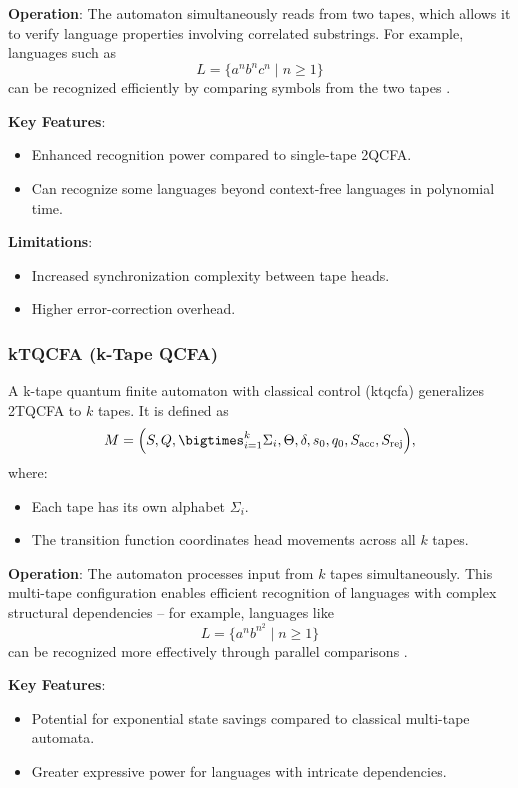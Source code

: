 \textbf{Operation}:  
The automaton simultaneously reads from two tapes, which allows it to verify language properties involving correlated substrings. For example, languages such as 
\[
L = \{a^n b^n c^n \mid n \geq 1\}
\]
can be recognized efficiently by comparing symbols from the two tapes \cite{zheng2012two}.

\textbf{Key Features}:
\begin{itemize}
    \item Enhanced recognition power compared to single-tape 2QCFA.
    \item Can recognize some languages beyond context-free languages in polynomial time.
\end{itemize}

\textbf{Limitations}:
\begin{itemize}
    \item Increased synchronization complexity between tape heads.
    \item Higher error-correction overhead.
\end{itemize}

\subsubsection{kTQCFA (k-Tape QCFA)}
\label{sssec:ktqcfa}
\begin{definition}[kTQCFA]
A k-tape quantum finite automaton with classical control (\gls{ktqcfa}) generalizes 2TQCFA to \( k \) tapes. It is defined as 
\[
M = \Bigl(S, Q, \bigtimes_{i=1}^{k} \Sigma_i, \Theta, \delta, s_0, q_0, S_{\text{acc}}, S_{\text{rej}}\Bigr),
\]
where:
\begin{itemize}
    \item Each tape has its own alphabet \( \Sigma_i \).
    \item The transition function coordinates head movements across all \( k \) tapes.
\end{itemize}
\end{definition}

\textbf{Operation}:  
The automaton processes input from \( k \) tapes simultaneously. This multi-tape configuration enables efficient recognition of languages with complex structural dependencies – for example, languages like 
\[
L = \{a^n b^{n^2} \mid n \geq 1\}
\]
can be recognized more effectively through parallel comparisons \cite{zheng2012two}.

\textbf{Key Features}:
\begin{itemize}
    \item Potential for exponential state savings compared to classical multi-tape automata.
    \item Greater expressive power for languages with intricate dependencies.
\end{itemize}

